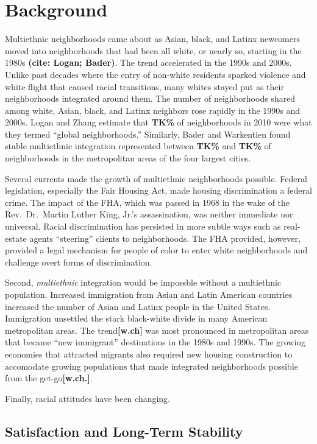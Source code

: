 \documentclass{baderart}
\begin{document}
\section{Background}\label{background}

Multiethnic neighborhoods came about as Asian, black, and Latinx
newcomers moved into neighborhoods that had been all white, or nearly
so, starting in the 1980s \textbf{(cite: Logan; Bader)}. The trend
accelerated in the 1990s and 2000s. Unlike past decades where the entry
of non-white residents sparked violence and white flight that caused
racial transitions, many whites stayed put as their neighborhoods
integrated around them. The number of neighborhoods shared among white,
Asian, black, and Latinx neighbors rose rapidly in the 1990s and 2000s.
Logan and Zhang estimate that \textbf{TK\%} of neighborhoods in 2010
were what they termed ``global neighborhoods.'' Similarly, Bader and
Warkentien found stable multiethnic integration represented between
\textbf{TK\%} and \textbf{TK\%} of neighborhoods in the metropolitan
areas of the four largest cities.

Several currents made the growth of multiethnic neighborhoods possible.
Federal legislation, especially the Fair Housing Act, made housing
discrimination a federal crime. The impact of the FHA, which was passed
in 1968 in the wake of the Rev.~Dr.~Martin Luther King, Jr.'s
assassination, was neither immediate nor universal. Racial
discrimination has persisted in more subtle ways such as real-estate
agents ``steering'' clients to neighborhoods. The FHA provided, however,
provided a legal mechanism for people of color to enter white
neighborhoods and challenge overt forms of discrimination.

Second, \emph{multiethnic} integration would be impossble without a
multiethnic population. Increased immigration from Asian and Latin
American countries increased the number of Asian and Latinx people in
the United States. Immigration unsettled the stark black-white divide in
many American metropolitan areas. The trend\textbf{{[}w.ch{]}} was most
pronounced in metropolitan areas that became ``new immigrant''
destinations in the 1980s and 1990s. The growing economies that
attracted migrants also required new housing construction to accomodate
growing populations that made integrated neighborhoods possible from the
get-go\textbf{{[}w.ch.{]}}.

Finally, racial attitudes have been changing.

\subsection{Satisfaction and Long-Term
Stability}\label{satisfaction-and-long-term-stability}
\end{document}
